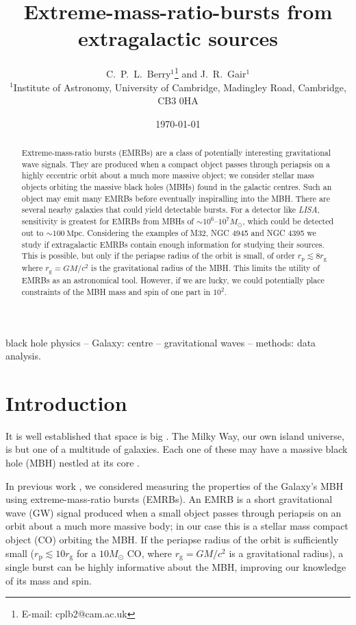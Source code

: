 \documentclass[useAMS,usedcolumn,usegraphicx,usenatbib]{mn2e}
\title[EMRBs from extragalactic sources]{Extreme-mass-ratio-bursts from extragalactic sources}
\author[C.\ P.\ L.\ Berry and J.\ R.\ Gair]{C.\ P.\ L.\ Berry$^{1}$\thanks{E-mail: cplb2@cam.ac.uk} and J.\ R.\ Gair$^{1}$\\
$^{1}$Institute of Astronomy, University of Cambridge, Madingley Road, Cambridge, CB3 0HA}
\newcommand{\units}[1]{\ensuremath{~\mathrm{#1}}}
\newcommand{\sub}[1]{\ensuremath{_\mathrm{#1}}}
\begin{document}
\date{\today}

\pagerange{\pageref{firstpage}--\pageref{lastpage}} 

\maketitle

\label{firstpage}

\begin{abstract}
Extreme-mass-ratio bursts (EMRBs) are a class of potentially interesting gravitational wave signals. They are produced when a compact object passes through periapsis on a highly eccentric orbit about a much more massive object; we consider stellar mass objects orbiting the massive black holes (MBHs) found in the galactic centres. Such an object may emit many EMRBs before eventually inspiralling into the MBH. There are several nearby galaxies that could yield detectable bursts. For a detector like \textit{LISA}, sensitivity is greatest for EMRBs from MBHs of $\sim10^6$--$10^7 M_\odot$, which could be detected out to $\sim 100\units{Mpc}$. Considering the examples of M32, NGC 4945 and NGC 4395 we study if extragalactic EMRBs contain enough information for studying their sources. This is possible, but only if the periapse radius of the orbit is small, of order $r\sub{p} \lesssim 8 r\sub{g}$ where $r\sub{g} = GM/c^2$ is the gravitational radius of the MBH. This limits the utility of EMRBs as an astronomical tool. However, if we are lucky, we could potentially place constraints of the MBH mass and spin of one part in $10^2$.
\end{abstract}

\begin{keywords}
black hole physics -- Galaxy: centre -- gravitational waves -- methods: data analysis.
\end{keywords}

\section{Introduction}\label{sec:Intro}

It is well established that space is big \citep[chapter 8]{Adams1979}. The Milky Way, our own island universe, is but one of a multitude of galaxies. Each one of these may have a massive black hole (MBH) nestled at its core \citep{Lynden-Bell1971, Soltan1982}.

In previous work \citep{Berry2013}, we considered measuring the properties of the Galaxy's MBH using extreme-mass-ratio bursts (EMRBs). An EMRB is a short gravitational wave (GW) signal produced when a small object passes through periapsis on an orbit about a much more massive body; in our case this is a stellar mass compact object (CO) orbiting the MBH. If the periapse radius of the orbit is sufficiently small ($r\sub{p} \lesssim 10 r\sub{g}$ for a $10 M_\odot$ CO, where $r\sub{g} = GM/c^2$ is a gravitational radius), a single burst can be highly informative about the MBH, improving our knowledge of its mass and spin.
\end{document}
